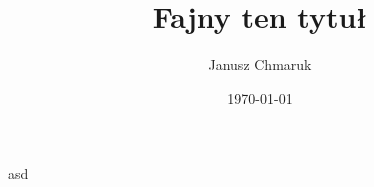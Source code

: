 \documentclass[10pt,a4paper,twoside,twocolumn]{article}%
\title{Fajny ten tytuł}%
\date{\today}%
\author{Janusz Chmaruk}%
\begin{document}

\null%

\clearpage%

\tableofcontents%

\begin{mdframed}[hidealllines=true]
    asd
\end{mdframed}
\end{document}
